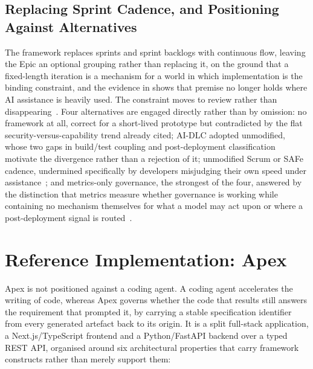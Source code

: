 \documentclass[sigconf,review=false]{acmart}
\begin{document}
\subsection{Replacing Sprint Cadence, and Positioning Against Alternatives}
The framework replaces sprints and sprint backlogs with continuous flow, leaving the Epic an optional grouping rather than replacing it, on the ground that a fixed-length iteration is a mechanism for a world in which implementation is the binding constraint, and the evidence in  shows that premise no longer holds where AI assistance is heavily used. The constraint moves to review rather than disappearing~\cite{Becker:2025rct, Faros:2025par}. Four alternatives are engaged directly rather than by omission: no framework at all, correct for a short-lived prototype but contradicted by the flat security-versus-capability trend already cited; AI-DLC adopted unmodified, whose two gaps in build/test coupling and post-deployment classification motivate the divergence rather than a rejection of it; unmodified Scrum or SAFe cadence, undermined specifically by developers misjudging their own speed under assistance~\cite{Becker:2025rct}; and metrics-only governance, the strongest of the four, answered by the distinction that metrics measure whether governance is working while containing no mechanism themselves for what a model may act upon or where a post-deployment signal is routed~\cite{Forsgren:2021sp}.

\section{Reference Implementation: Apex}
\label{sec:apex}

Apex is not positioned against a coding agent. A coding agent accelerates the writing of code, whereas Apex governs whether the code that results still answers the requirement that prompted it, by carrying a stable specification identifier from every generated artefact back to its origin. It is a split full-stack application, a Next.js/TypeScript frontend and a Python/FastAPI backend over a typed REST API, organised around six architectural properties that carry framework constructs rather than merely support them:
\end{document}
